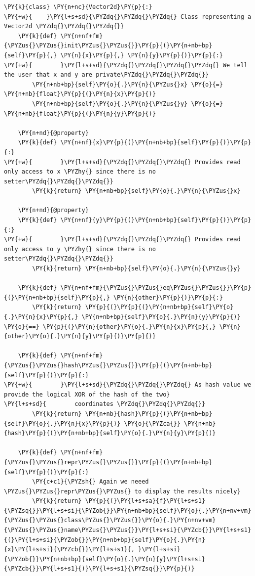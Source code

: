 \begin{Verbatim}[label=\makebox{\url{https://github.com/lucabaldini/cmepda/tree/master/slides/latex/snippets/vector2d\_hashable.py}},commandchars=\\\{\}]
\PY{k}{class} \PY{n+nc}{Vector2d}\PY{p}{:}
\PY{+w}{    }\PY{l+s+sd}{\PYZdq{}\PYZdq{}\PYZdq{} Class representing a Vector2d \PYZdq{}\PYZdq{}\PYZdq{}}
    \PY{k}{def} \PY{n+nf+fm}{\PYZus{}\PYZus{}init\PYZus{}\PYZus{}}\PY{p}{(}\PY{n+nb+bp}{self}\PY{p}{,} \PY{n}{x}\PY{p}{,} \PY{n}{y}\PY{p}{)}\PY{p}{:}
\PY{+w}{        }\PY{l+s+sd}{\PYZdq{}\PYZdq{}\PYZdq{}\PYZdq{} We tell the user that x and y are private\PYZdq{}\PYZdq{}\PYZdq{}}
        \PY{n+nb+bp}{self}\PY{o}{.}\PY{n}{\PYZus{}x} \PY{o}{=} \PY{n+nb}{float}\PY{p}{(}\PY{n}{x}\PY{p}{)}
        \PY{n+nb+bp}{self}\PY{o}{.}\PY{n}{\PYZus{}y} \PY{o}{=} \PY{n+nb}{float}\PY{p}{(}\PY{n}{y}\PY{p}{)}

    \PY{n+nd}{@property}
    \PY{k}{def} \PY{n+nf}{x}\PY{p}{(}\PY{n+nb+bp}{self}\PY{p}{)}\PY{p}{:}
\PY{+w}{        }\PY{l+s+sd}{\PYZdq{}\PYZdq{}\PYZdq{} Provides read only access to x \PYZhy{} since there is no setter\PYZdq{}\PYZdq{}\PYZdq{}}
        \PY{k}{return} \PY{n+nb+bp}{self}\PY{o}{.}\PY{n}{\PYZus{}x}

    \PY{n+nd}{@property}
    \PY{k}{def} \PY{n+nf}{y}\PY{p}{(}\PY{n+nb+bp}{self}\PY{p}{)}\PY{p}{:}
\PY{+w}{        }\PY{l+s+sd}{\PYZdq{}\PYZdq{}\PYZdq{} Provides read only access to y \PYZhy{} since there is no setter\PYZdq{}\PYZdq{}\PYZdq{}}
        \PY{k}{return} \PY{n+nb+bp}{self}\PY{o}{.}\PY{n}{\PYZus{}y}

    \PY{k}{def} \PY{n+nf+fm}{\PYZus{}\PYZus{}eq\PYZus{}\PYZus{}}\PY{p}{(}\PY{n+nb+bp}{self}\PY{p}{,} \PY{n}{other}\PY{p}{)}\PY{p}{:}
        \PY{k}{return} \PY{p}{(}\PY{p}{(}\PY{n+nb+bp}{self}\PY{o}{.}\PY{n}{x}\PY{p}{,} \PY{n+nb+bp}{self}\PY{o}{.}\PY{n}{y}\PY{p}{)} \PY{o}{==} \PY{p}{(}\PY{n}{other}\PY{o}{.}\PY{n}{x}\PY{p}{,} \PY{n}{other}\PY{o}{.}\PY{n}{y}\PY{p}{)}\PY{p}{)}

    \PY{k}{def} \PY{n+nf+fm}{\PYZus{}\PYZus{}hash\PYZus{}\PYZus{}}\PY{p}{(}\PY{n+nb+bp}{self}\PY{p}{)}\PY{p}{:}
\PY{+w}{        }\PY{l+s+sd}{\PYZdq{}\PYZdq{}\PYZdq{} As hash value we provide the logical XOR of the hash of the two}
\PY{l+s+sd}{        coordinates \PYZdq{}\PYZdq{}\PYZdq{}}
        \PY{k}{return} \PY{n+nb}{hash}\PY{p}{(}\PY{n+nb+bp}{self}\PY{o}{.}\PY{n}{x}\PY{p}{)} \PY{o}{\PYZca{}} \PY{n+nb}{hash}\PY{p}{(}\PY{n+nb+bp}{self}\PY{o}{.}\PY{n}{y}\PY{p}{)}

    \PY{k}{def} \PY{n+nf+fm}{\PYZus{}\PYZus{}repr\PYZus{}\PYZus{}}\PY{p}{(}\PY{n+nb+bp}{self}\PY{p}{)}\PY{p}{:}
        \PY{c+c1}{\PYZsh{} Again we neeed \PYZus{}\PYZus{}repr\PYZus{}\PYZus{} to display the results nicely}
        \PY{k}{return} \PY{p}{(}\PY{l+s+sa}{f}\PY{l+s+s1}{\PYZsq{}}\PY{l+s+si}{\PYZob{}}\PY{n+nb+bp}{self}\PY{o}{.}\PY{n+nv+vm}{\PYZus{}\PYZus{}class\PYZus{}\PYZus{}}\PY{o}{.}\PY{n+nv+vm}{\PYZus{}\PYZus{}name\PYZus{}\PYZus{}}\PY{l+s+si}{\PYZcb{}}\PY{l+s+s1}{(}\PY{l+s+si}{\PYZob{}}\PY{n+nb+bp}{self}\PY{o}{.}\PY{n}{x}\PY{l+s+si}{\PYZcb{}}\PY{l+s+s1}{, }\PY{l+s+si}{\PYZob{}}\PY{n+nb+bp}{self}\PY{o}{.}\PY{n}{y}\PY{l+s+si}{\PYZcb{}}\PY{l+s+s1}{)}\PY{l+s+s1}{\PYZsq{}}\PY{p}{)}
\end{Verbatim}
